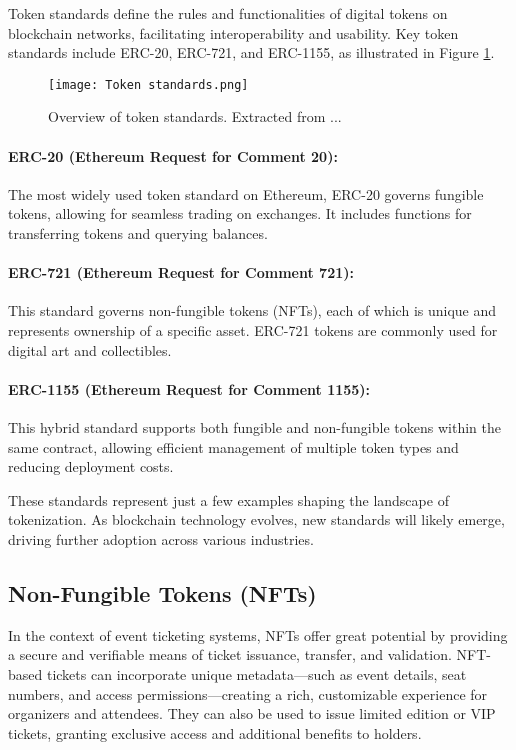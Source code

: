 Token standards define the rules and functionalities of digital tokens on
blockchain networks, facilitating interoperability and usability. Key token
standards include ERC-20, ERC-721, and ERC-1155, as illustrated in Figure
\ref{fig:token_standards}.

\begin{figure}[H]
    \centering
    \texttt{[image: Token standards.png]}
    \caption[Token standards]{Overview of token standards. Extracted from ...}
    \label{fig:token_standards}
\end{figure}

\paragraph{ERC-20 (Ethereum Request for Comment 20):}
The most widely used token standard on Ethereum, ERC-20 governs fungible
tokens, allowing for seamless trading on exchanges. It includes functions for
transferring tokens and querying balances.

\paragraph{ERC-721 (Ethereum Request for Comment 721):}
This standard governs non-fungible tokens (NFTs), each of which is unique and
represents ownership of a specific asset. ERC-721 tokens are commonly used for
digital art and collectibles.

\paragraph{ERC-1155 (Ethereum Request for Comment 1155):}
This hybrid standard supports both fungible and non-fungible tokens within the
same contract, allowing efficient management of multiple token types and
reducing deployment costs.

These standards represent just a few examples shaping the landscape of
tokenization. As blockchain technology evolves, new standards will likely
emerge, driving further adoption across various industries.

\subsection{Non-Fungible Tokens (NFTs)}
\label{subsec:nfts}

In the context of event ticketing systems, NFTs offer great potential by
providing a secure and verifiable means of ticket issuance, transfer, and
validation. NFT-based tickets can incorporate unique metadata—such as event
details, seat numbers, and access permissions—creating a rich, customizable
experience for organizers and attendees. They can also be used to issue limited
edition or VIP tickets, granting exclusive access and additional benefits to
holders.
